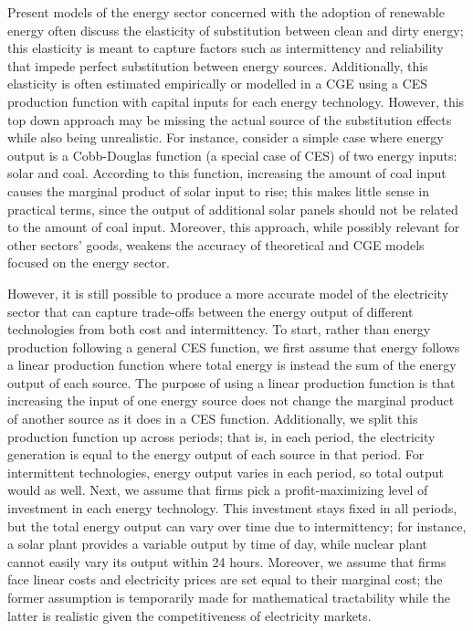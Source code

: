 \documentclass[12pt,a4paper]{extarticle}
\begin{document}
Present models of the energy sector concerned with the adoption of renewable energy often discuss the elasticity of substitution between clean and dirty energy; this elasticity is meant to capture factors such as intermittency and reliability that impede perfect substitution between energy sources. Additionally, this elasticity is often estimated empirically or modelled in a CGE using a CES production function with capital inputs for each energy technology. However, this top down approach may be missing the actual source of the substitution effects while also being unrealistic. For instance, consider a simple case where energy output is a Cobb-Douglas function (a special case of CES) of two energy inputs: solar and coal. According to this function, increasing the amount of coal input causes the marginal product of solar input to rise; this makes little sense in practical terms, since the output of additional solar panels should not be related to the amount of coal input. Moreover, this approach, while possibly relevant for other sectors' goods, weakens the accuracy of theoretical and CGE models focused on the energy sector.

However, it is still possible to produce a more accurate model of the electricity sector that can capture trade-offs between the energy output of different technologies from both cost and intermittency. To start, rather than energy production following a general CES function, we first assume that energy follows a linear production function where total energy is instead the sum of the energy output of each source. The purpose of using a linear production function is that increasing the input of one energy source does not change the marginal product of another source as it does in a CES function. Additionally, we split this production function up across periods; that is, in each period, the electricity generation is equal to the energy output of each source in that period. For intermittent technologies, energy output varies in each period, so total output would as well. Next, we assume that firms pick a profit-maximizing level of investment in each energy technology. This investment stays fixed in all periods, but the total energy output can vary over time due to intermittency; for instance, a solar plant provides a variable output by time of day, while nuclear plant cannot easily vary its output within 24 hours. Moreover, we assume that firms face linear costs and electricity prices are set equal to their marginal cost; the former assumption is temporarily made for mathematical tractability while the latter is realistic given the competitiveness of electricity markets. 
\end{document}

